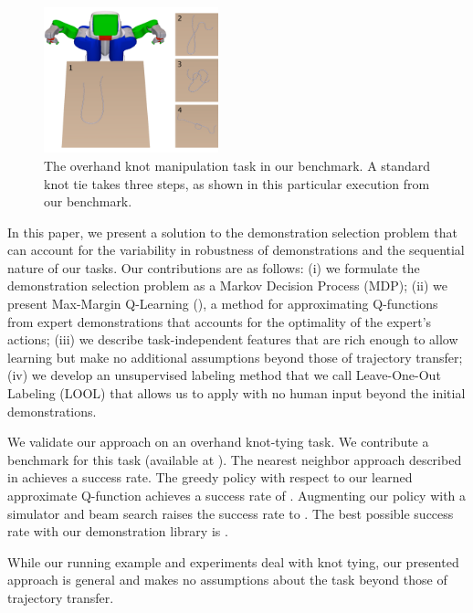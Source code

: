 \begin{figure}[t]
  \centering
    \noindent
    \includegraphics[width=0.45\textwidth]{figures/knot_steps_num.png}
  \caption{The overhand knot manipulation task in our benchmark.
           A standard knot tie takes three steps, as shown in this
           particular execution from our benchmark.}
  \label{fig:knot_steps}
\end{figure}

In this paper, we present a solution to the demonstration selection problem that
can account for the variability in robustness of demonstrations and the
sequential nature of our tasks. Our contributions are as follows:
(i) we formulate the demonstration selection problem as a Markov Decision
Process (MDP); (ii) we present Max-Margin Q-Learning (\mmql{}), a method for
approximating Q-functions from expert demonstrations that accounts for the
optimality of the expert's actions; (iii) we describe task-independent
features that are rich enough to allow learning but make no additional
assumptions beyond those of trajectory transfer; (iv) we develop an unsupervised
labeling method that we call Leave-One-Out Labeling (LOOL) that allows
us to apply \mmql{} with no human input beyond the initial demonstrations.

We validate our approach on an overhand knot-tying task. We contribute a
benchmark for this task (available at ). The nearest
neighbor approach described in \citet{Schulmanetal_ISRR2013} achieves a
\al{\#} success rate. The greedy policy with respect to our learned
approximate Q-function achieves a success rate of \al{\#}. Augmenting our
policy with a simulator and beam search raises the success rate to \al{\#}.
The best possible success rate with our demonstration library is \al{\#}.

While our running example and experiments deal with knot tying, our presented
\mmql{} approach is general and makes no assumptions about the task
beyond those of trajectory transfer.
